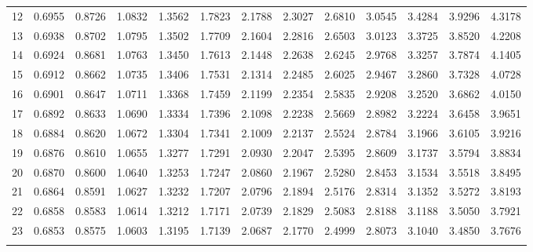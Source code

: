 {\begin{tabular}{l|llllllllllll}
 12 & 0.6955 & 0.8726 & 1.0832 & 1.3562 & 1.7823 & 2.1788 & 2.3027 & 2.6810 & 3.0545 & 3.4284 & 3.9296 & 4.3178 \\[5pt] \arrayrulecolor{light-gray}\hline\arrayrulecolor{black}  
 13 & 0.6938 & 0.8702 & 1.0795 & 1.3502 & 1.7709 & 2.1604 & 2.2816 & 2.6503 & 3.0123 & 3.3725 & 3.8520 & 4.2208 \\[5pt] \arrayrulecolor{light-gray}\hline\arrayrulecolor{black}  
 14 & 0.6924 & 0.8681 & 1.0763 & 1.3450 & 1.7613 & 2.1448 & 2.2638 & 2.6245 & 2.9768 & 3.3257 & 3.7874 & 4.1405 \\[12pt] \arrayrulecolor{light-gray}\hline\arrayrulecolor{black}  
 15 & 0.6912 & 0.8662 & 1.0735 & 1.3406 & 1.7531 & 2.1314 & 2.2485 & 2.6025 & 2.9467 & 3.2860 & 3.7328 & 4.0728 \\[5pt] \arrayrulecolor{light-gray}\hline\arrayrulecolor{black}  
 16 & 0.6901 & 0.8647 & 1.0711 & 1.3368 & 1.7459 & 2.1199 & 2.2354 & 2.5835 & 2.9208 & 3.2520 & 3.6862 & 4.0150 \\[5pt] \arrayrulecolor{light-gray}\hline\arrayrulecolor{black}  
 17 & 0.6892 & 0.8633 & 1.0690 & 1.3334 & 1.7396 & 2.1098 & 2.2238 & 2.5669 & 2.8982 & 3.2224 & 3.6458 & 3.9651 \\[5pt] \arrayrulecolor{light-gray}\hline\arrayrulecolor{black}  
 18 & 0.6884 & 0.8620 & 1.0672 & 1.3304 & 1.7341 & 2.1009 & 2.2137 & 2.5524 & 2.8784 & 3.1966 & 3.6105 & 3.9216 \\[5pt] \arrayrulecolor{light-gray}\hline\arrayrulecolor{black}  
 19 & 0.6876 & 0.8610 & 1.0655 & 1.3277 & 1.7291 & 2.0930 & 2.2047 & 2.5395 & 2.8609 & 3.1737 & 3.5794 & 3.8834 \\[12pt] \arrayrulecolor{light-gray}\hline\arrayrulecolor{black}  
 20 & 0.6870 & 0.8600 & 1.0640 & 1.3253 & 1.7247 & 2.0860 & 2.1967 & 2.5280 & 2.8453 & 3.1534 & 3.5518 & 3.8495 \\[5pt] \arrayrulecolor{light-gray}\hline\arrayrulecolor{black}  
 21 & 0.6864 & 0.8591 & 1.0627 & 1.3232 & 1.7207 & 2.0796 & 2.1894 & 2.5176 & 2.8314 & 3.1352 & 3.5272 & 3.8193 \\[5pt] \arrayrulecolor{light-gray}\hline\arrayrulecolor{black}  
 22 & 0.6858 & 0.8583 & 1.0614 & 1.3212 & 1.7171 & 2.0739 & 2.1829 & 2.5083 & 2.8188 & 3.1188 & 3.5050 & 3.7921 \\[5pt] \arrayrulecolor{light-gray}\hline\arrayrulecolor{black}  
 23 & 0.6853 & 0.8575 & 1.0603 & 1.3195 & 1.7139 & 2.0687 & 2.1770 & 2.4999 & 2.8073 & 3.1040 & 3.4850 & 3.7676 \\[5pt] \arrayrulecolor{light-gray}\hline\arrayrulecolor{black}  

\end{tabular}}
